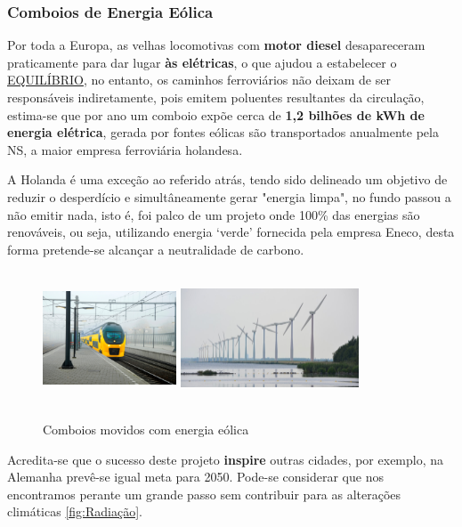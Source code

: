\documentclass[letterpaper,12pt]{article}
\begin{document}
\subsubsection{Comboios de Energia Eólica}
\par \citep{rosa_2017_trens,camargo_2015_trens}Por toda a Europa, as velhas locomotivas com {\bf motor diesel} desapareceram praticamente para dar lugar {\bf às elétricas}, o que ajudou a estabelecer o \underline{EQUILÍBRIO}, no entanto, os caminhos ferroviários não deixam de ser responsáveis indiretamente, pois emitem poluentes resultantes da circulação, estima-se que por ano um comboio expõe cerca de {\bf 1,2 bilhões de kWh de energia elétrica}, gerada por fontes eólicas são transportados anualmente pela NS, a maior empresa ferroviária holandesa.
\par A Holanda é uma exceção ao referido atrás, tendo sido delineado um objetivo de reduzir o desperdício e simultâneamente gerar "energia limpa", no fundo passou a não emitir nada, isto é, foi palco de um projeto onde 100\% das energias são renováveis, ou seja, utilizando energia ‘verde’ fornecida pela empresa Eneco, desta forma pretende-se alcançar a neutralidade de carbono.
\begin{figure}[!htb] 
    \centering
    \includegraphics[width = 150px, height = 150px, angle = 20]{comboio.jpg}
    \includegraphics[width = 200px, height = 150px, angle = 340]{eolicas.jpg}
    \caption{Comboios movidos com energia eólica}
    \label{Energia renovável}
\end{figure}
\par Acredita-se que o sucesso deste projeto {\bf inspire} outras cidades, por exemplo, na Alemanha prevê-se igual meta para 2050. Pode-se considerar que nos encontramos perante um grande passo sem contribuir para as alterações climáticas \ref{fig:Radiação}.
\newpage
\end{document}
